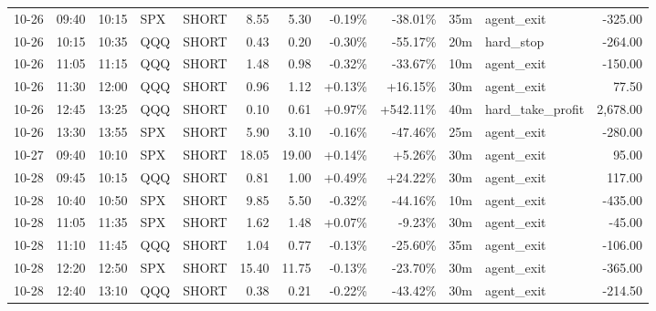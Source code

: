\documentclass[11pt,a4paper,twoside]{article}
\begin{document}
\begin{center}
\begin{longtable}{>{\color{txtmain}}l l l l l r r r r r >{\color{txtmain}}l r}
10-26 & 09:40 & 10:15 & SPX & SHORT & 8.55 & 5.30 & \textcolor{lossred}{-0.19\%} & \textcolor{lossred}{-38.01\%} & 35m & agent\_exit & \textcolor{lossred}{-325.00} \\
10-26 & 10:15 & 10:35 & QQQ & SHORT & 0.43 & 0.20 & \textcolor{lossred}{-0.30\%} & \textcolor{lossred}{-55.17\%} & 20m & hard\_stop & \textcolor{lossred}{-264.00} \\
10-26 & 11:05 & 11:15 & QQQ & SHORT & 1.48 & 0.98 & \textcolor{lossred}{-0.32\%} & \textcolor{lossred}{-33.67\%} & 10m & agent\_exit & \textcolor{lossred}{-150.00} \\
10-26 & 11:30 & 12:00 & QQQ & SHORT & 0.96 & 1.12 & \textcolor{wingreen}{+0.13\%} & \textcolor{wingreen}{+16.15\%} & 30m & agent\_exit & \textcolor{wingreen}{77.50} \\
10-26 & 12:45 & 13:25 & QQQ & SHORT & 0.10 & 0.61 & \textcolor{wingreen}{+0.97\%} & \textcolor{wingreen}{+542.11\%} & 40m & hard\_take\_profit & \textcolor{wingreen}{2,678.00} \\
10-26 & 13:30 & 13:55 & SPX & SHORT & 5.90 & 3.10 & \textcolor{lossred}{-0.16\%} & \textcolor{lossred}{-47.46\%} & 25m & agent\_exit & \textcolor{lossred}{-280.00} \\
10-27 & 09:40 & 10:10 & SPX & SHORT & 18.05 & 19.00 & \textcolor{wingreen}{+0.14\%} & \textcolor{wingreen}{+5.26\%} & 30m & agent\_exit & \textcolor{wingreen}{95.00} \\
10-28 & 09:45 & 10:15 & QQQ & SHORT & 0.81 & 1.00 & \textcolor{wingreen}{+0.49\%} & \textcolor{wingreen}{+24.22\%} & 30m & agent\_exit & \textcolor{wingreen}{117.00} \\
10-28 & 10:40 & 10:50 & SPX & SHORT & 9.85 & 5.50 & \textcolor{lossred}{-0.32\%} & \textcolor{lossred}{-44.16\%} & 10m & agent\_exit & \textcolor{lossred}{-435.00} \\
10-28 & 11:05 & 11:35 & SPX & SHORT & 1.62 & 1.48 & \textcolor{wingreen}{+0.07\%} & \textcolor{lossred}{-9.23\%} & 30m & agent\_exit & \textcolor{lossred}{-45.00} \\
10-28 & 11:10 & 11:45 & QQQ & SHORT & 1.04 & 0.77 & \textcolor{lossred}{-0.13\%} & \textcolor{lossred}{-25.60\%} & 35m & agent\_exit & \textcolor{lossred}{-106.00} \\
10-28 & 12:20 & 12:50 & SPX & SHORT & 15.40 & 11.75 & \textcolor{lossred}{-0.13\%} & \textcolor{lossred}{-23.70\%} & 30m & agent\_exit & \textcolor{lossred}{-365.00} \\
10-28 & 12:40 & 13:10 & QQQ & SHORT & 0.38 & 0.21 & \textcolor{lossred}{-0.22\%} & \textcolor{lossred}{-43.42\%} & 30m & agent\_exit & \textcolor{lossred}{-214.50} \\

\end{longtable}
\end{center}
\end{document}

